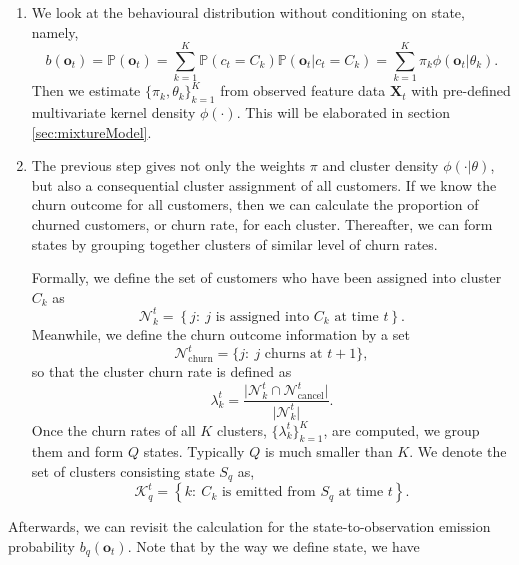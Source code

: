 \begin{enumerate}
\item We look at the behavioural distribution without conditioning on state, namely,
\begin{equation}
b(\mathbf{o}_t) = \mathbb{P} (\mathbf{o}_t) = \sum_{k=1}^K \mathbb{P} (c_t = C_k) \mathbb{P} (\mathbf{o}_t | c_t = C_k) = \sum_{k=1}^K \pi_k \phi(\mathbf{o}_t | \theta_k).
\label{eq:bo}
\end{equation}
Then we estimate $\{ \pi_k, \theta_k \}_{k=1}^K$ from observed feature data $\mathbf{X}_t$ with pre-defined multivariate kernel density $\phi(\cdot)$. This will be elaborated in section \ref{sec:mixtureModel}.

\item The previous step gives not only the weights $\pi$ and cluster density $\phi(\cdot | \theta)$, but also a consequential cluster assignment of all customers. If we know the churn outcome for all customers, then we can calculate the proportion of churned customers, or churn rate, for each cluster. Thereafter, we can form states by grouping together clusters of similar level of churn rates.

Formally, we define the set of customers who have been assigned into cluster $C_k$ as
\begin{equation}
\mathcal{N}_k^t = \left\lbrace j :~ j \text{ is assigned into } C_k \text{ at time } t \right\rbrace.
\end{equation}
Meanwhile, we define the churn outcome information by a set
\begin{equation}
\mathcal{N}_\text{churn}^t = \{j: ~j \text{ churns at } t+1 \},
\end{equation}
so that the cluster churn rate is defined as
\begin{equation}
\lambda_k^t = \frac{\vert \mathcal{N}_k^t \cap \mathcal{N}_\text{cancel}^t \vert}{\vert  \mathcal{N}_k^t \vert}.
\label{eq:clusterChurn}
\end{equation}
Once the churn rates of all $K$ clusters, $\{ \lambda_k^t \}_{k=1}^K$, are computed, we group them and form $Q$ states. Typically $Q$ is much smaller than $K$. We denote the set of clusters consisting state $S_q$ as,
\begin{equation}
\mathcal{K}_q^t = \left\lbrace k :~ C_k \text{ is emitted from } S_q \text{ at time } t \right\rbrace.
\end{equation}
\end{enumerate}
Afterwards, we can revisit the calculation for the state-to-observation emission probability $b_q(\mathbf{o}_t)$. Note that by the way we define state, we have
